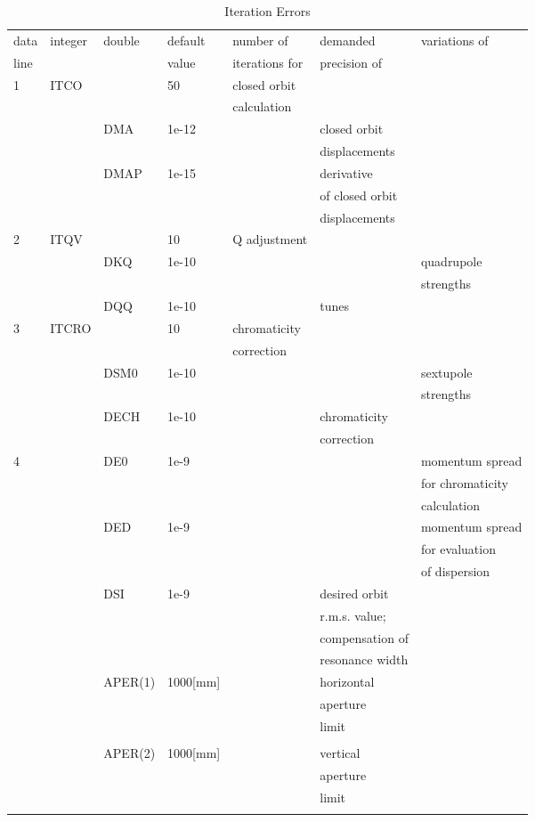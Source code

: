 \documentclass[a4paper,11pt]{report}
\begin{document}
\begin{table}[h]
\caption{Iteration Errors}
\label{T-IteErr}
\scriptsize \centering
\begin{tabular}{|l|l|l|l|l|l|l|}
  \hline data & integer & double & default & number of & demanded &
  variations
  of \\
  line & & & value & iterations for & precision of & \\
  \hline
  1 & ITCO & & 50 & closed orbit & & \\
  & & & & calculation & & \\
  \hline
  & & DMA & 1e-12 & & closed orbit & \\
  & & & & & displacements & \\
  \hline
  & & DMAP & 1e-15 & & derivative & \\
  & & & & & of closed orbit & \\
  & & & & & displacements & \\
  \hline
  2 & ITQV & & 10 & Q adjustment & & \\
  \hline
  & & DKQ & 1e-10 & & & quadrupole \\
  & & & & & & strengths \\
  \hline
  & & DQQ & 1e-10 & & tunes & \\
  \hline
  3 & ITCRO & & 10 & chromaticity & & \\
  & & & & correction & & \\
  \hline
  & & DSM0 & 1e-10 & & & sextupole \\
  & & & & & & strengths \\
  \hline
  & & DECH & 1e-10 & & chromaticity & \\
  & & & & & correction & \\
  \hline
  4 & & DE0 & 1e-9 & & & momentum spread \\
  & & & & & & for chromaticity \\
  & & & & & & calculation \\
  \hline
  & & DED & 1e-9 & & & momentum spread \\
  & & & & & & for evaluation \\
  & & & & & & of dispersion \\
  \hline
  & & DSI & 1e-9 & & desired orbit & \\
  & & & & & r.m.s. value; & \\
  & & & & & compensation of & \\
  & & & & & resonance width & \\
  \hline
  & & APER(1) & 1000[mm] & & horizontal & \\
  & & & & & aperture & \\
  & & & & & limit & \\
  & & & & & & \\
  \hline
  & & APER(2) & 1000[mm] & & vertical & \\
  & & & & & aperture & \\
  & & & & & limit & \\
  & & & & & & \\
  \hline
\end{tabular}
\normalsize
\end{table}
\end{document}
